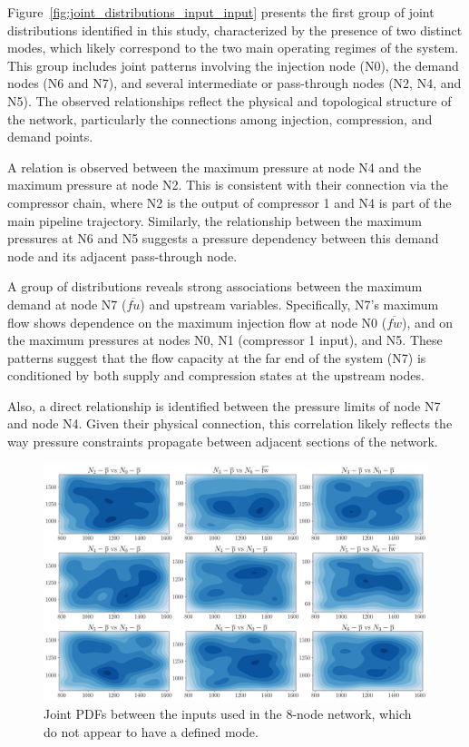 Figure~\cref{fig:joint_distributions_input_input} presents the first group of joint distributions identified in this study, characterized by the presence of two distinct modes, which likely correspond to the two main operating regimes of the system. This group includes joint patterns involving the injection node (N0), the demand nodes (N6 and N7), and several intermediate or pass-through nodes (N2, N4, and N5). The observed relationships reflect the physical and topological structure of the network, particularly the connections among injection, compression, and demand points.

A relation is observed between the maximum pressure at node N4 and the maximum pressure at node N2. This is consistent with their connection via the compressor chain, where N2 is the output of compressor 1 and N4 is part of the main pipeline trajectory. Similarly, the relationship between the maximum pressures at N6 and N5 suggests a pressure dependency between this demand node and its adjacent pass-through node.

A group of distributions reveals strong associations between the maximum demand at node N7 ($\overline{fu}$) and upstream variables. Specifically, N7's maximum flow shows dependence on the maximum injection flow at node N0 ($\overline{fw}$), and on the maximum pressures at nodes N0, N1 (compressor 1 input), and N5. These patterns suggest that the flow capacity at the far end of the system (N7) is conditioned by both supply and compression states at the upstream nodes. 

Also, a direct relationship is identified between the pressure limits of node N7 and node N4. Given their physical connection, this correlation likely reflects the way pressure constraints propagate between adjacent sections of the network.

\begin{figure}
    \begin{center}
        \includegraphics[width=.75\textwidth]{figures/Chapter_NonLinealCensnet/PDF_inputs_inputs_no_mode.png}
    \end{center}
    \caption{Joint PDFs between the inputs used in the 8-node network, which do not appear to have a defined mode. }
    \label{fig:joint_distributions_input_input_no_mode}
\end{figure}
 

